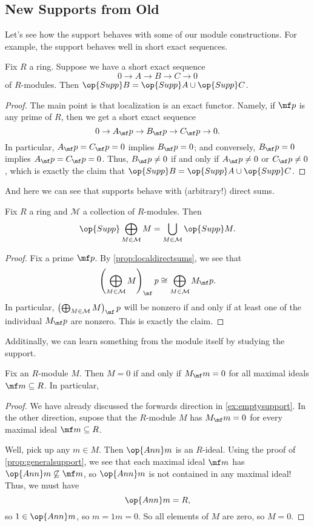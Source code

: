 \subsection{New Supports from Old}
Let's see how the support behaves with some of our module constructions. For example, the support behaves well in short exact sequences.
\begin{proposition}
	Fix $R$ a ring. Suppose we have a short exact sequence
	\[0\to A\to B\to C\to 0\]
	of $R$-modules. Then $\op{Supp}B=\op{Supp}A\cup\op{Supp}C$.
\end{proposition}
\begin{proof}
	The main point is that localization is an exact functor. Namely, if $\mf p$ is any prime of $R$, then we get a short exact sequence
	\[0\to A_\mf p\to B_\mf p\to C_\mf p\to0.\]
	In particular, $A_\mf p=C_\mf p=0$ implies $B_\mf p=0$; and conversely, $B_\mf p=0$ implies $A_\mf p=C_\mf p=0$. Thus, $B_\mf p\ne0$ if and only if $A_\mf p\ne0$ or $C_\mf p\ne0$, which is exactly the claim that $\op{Supp}B=\op{Supp}A\cup\op{Supp}C$.
\end{proof}
And here we can see that supports behave with (arbitrary!) direct sums.
\begin{proposition}
	Fix $R$ a ring and $\mathcal M$ a collection of $R$-modules. Then
	\[\op{Supp}\bigoplus_{M\in\mathcal M}M=\bigcup_{M\in\mathcal M}\op{Supp}M.\]
\end{proposition}
\begin{proof}
	Fix a prime $\mf p$. By \autoref{prop:localdirectsums}, we see that
	\[\left(\bigoplus_{M\in\mathcal M}M\right)_\mf p\cong\bigoplus_{M\in\mathcal M}M_\mf p.\]
	In particular, $\left(\bigoplus_{M\in\mathcal M}M\right)_\mf p$ will be nonzero if and only if at least one of the individual $M_\mf p$ are nonzero. This is exactly the claim.
\end{proof}
Additinally, we can learn something from the module itself by studying the support.
\begin{proposition}
	Fix an $R$-module $M$. Then $M=0$ if and only if $M_\mf m=0$ for all maximal ideals $\mf m\subseteq R$. In particular, 
\end{proposition}
\begin{proof}
	We have already discussed the forwards direction in \autoref{ex:emptysupport}. In the other direction, supose that the $R$-module $M$ has $M_\mf m=0$ for every maximal ideal $\mf m\subseteq R$.

	Well, pick up any $m\in M$. Then $\op{Ann}m$ is an $R$-ideal. Using the proof of \autoref{prop:generalsupport}, we see that each maximal ideal $\mf m$ has $\op{Ann}m\not\subseteq\mf m$, so $\op{Ann}m$ is not contained in any maximal ideal! Thus, we must have
	\[\op{Ann}m=R,\]
	so $1\in\op{Ann}m$, so $m=1m=0$. So all elements of $M$ are zero, so $M=0$.
\end{proof}

